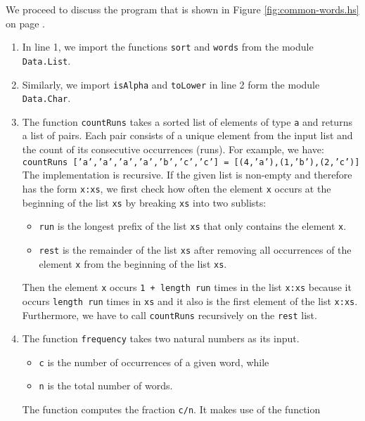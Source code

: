 We proceed to discuss the program that is shown in Figure \ref{fig:common-words.hs} on page
\pageref{fig:common-words.hs}. 
\begin{enumerate}
\item In line 1, we import the functions \texttt{sort} and \texttt{words} from the module \texttt{Data.List}. 
\item Similarly, we import \texttt{isAlpha} and \texttt{toLower} in line 2 form the module \texttt{Data.Char}.
\item The function \texttt{countRuns} takes a sorted list of elements of type \texttt{a}
      and returns a list of pairs.  Each pair consists of a unique element from the input list
      and the count of its consecutive occurrences (runs).
      For example, we have:
      \\[0.2cm]
      \hspace*{0.8cm}
      \texttt{countRuns ['a','a','a','a','b','c','c'] = [(4,'a'),(1,'b'),(2,'c')]}
      \\[0.2cm]
      The implementation is recursive.  If the given list is non-empty and therefore has the form
      \texttt{x:xs}, we first check how often the element \texttt{x} occurs at the beginning of the list
      \texttt{xs} by breaking \texttt{xs} into two sublists:
      \begin{itemize}
      \item \texttt{run} is the longest prefix of the list \texttt{xs} that only contains the element
            \texttt{x}.
      \item \texttt{rest} is the remainder of the list \texttt{xs} after removing all occurrences of the
            element \texttt{x} from the beginning of the list \texttt{xs}.    
      \end{itemize}
      Then the element \texttt{x} occurs \texttt{1 + length run} times in the list \texttt{x:xs} because it
      occurs \texttt{length run} times in \texttt{xs} and it also is the first element of the list \texttt{x:xs}.
      Furthermore, we have to call \texttt{countRuns} recursively on the \texttt{rest} list.
\item The function \texttt{frequency} takes two natural numbers as its input.
      \begin{itemize}
      \item \texttt{c} is the number of occurrences of a given word, while
      \item \texttt{n} is the total number of words.
      \end{itemize}
      The function computes the fraction \texttt{c/n}.  It makes use of the function

\end{enumerate}
